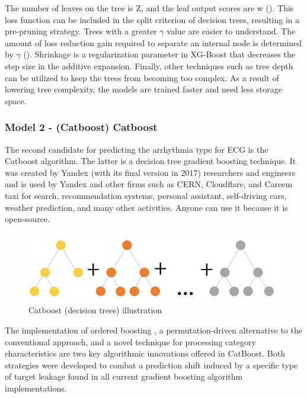 \noindent

The number of leaves on the tree is Z, and the leaf output scores are w (\cite{xgb2}). This loss function can be included in the split criterion of decision trees, resulting in a pre-pruning strategy. Trees with a greater $\gamma$ value are easier to understand. The amount of loss reduction gain required to separate an internal node is determined by $\gamma$ (\cite{xgb1}). Shrinkage is a regularization parameter in XG-Boost that decreases the step size in the additive expansion. Finally, other techniques such as tree depth can be utilized to keep the trees from becoming too complex. As a result of lowering tree complexity, the models are trained faster and need less storage space.

\subsubsection{Model 2 - (Catboost) Catboost} \label{3model2}

The second candidate for predicting the arrhythmia type for ECG is the Catboost algorithm. The latter is a decision tree gradient boosting technique. It was created by Yandex (with its final version in 2017) researchers and engineers and is used by Yandex and other firms such as CERN, Cloudflare, and Careem taxi for search, recommendation systems, personal assistant, self-driving cars, weather prediction, and many other activities. Anyone can use it because it is open-source.

\begin{figure}[H]
\centering
\includegraphics[scale=0.6]{img/catboost.PNG}
\caption{Catboost (decision trees) illustration}
\label{fig:catboost}
\end{figure}

The implementation of ordered boosting \cite{catboost}, a permutation-driven alternative to the conventional approach, and a novel technique for processing category characteristics are two key algorithmic innovations offered in CatBoost. Both strategies were developed to combat a prediction shift induced by a specific type of target leakage found in all current gradient boosting algorithm implementations.

